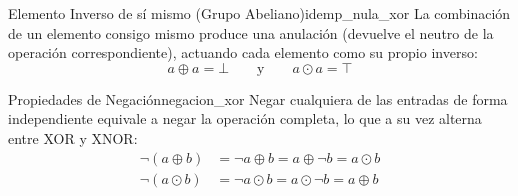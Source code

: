 \begin{teorema}{Elemento Inverso de sí mismo (Grupo Abeliano)}{idemp_nula_xor}
La combinación de un elemento consigo mismo produce una anulación (devuelve el neutro de la operación correspondiente), actuando cada elemento como su propio inverso:
\[ a \oplus a = \bot \qquad \text{y} \qquad a \odot a = \top \]
\end{teorema}

\begin{teorema}{Propiedades de Negación}{negacion_xor}
Negar cualquiera de las entradas de forma independiente equivale a negar la operación completa, lo que a su vez alterna entre XOR y XNOR:
\begin{align*}
    \neg (a \oplus b) &= \neg a \oplus b = a \oplus \neg b = a \odot b \\
    \neg (a \odot b) &= \neg a \odot b = a \odot \neg b = a \oplus b
\end{align*}
\end{teorema}

